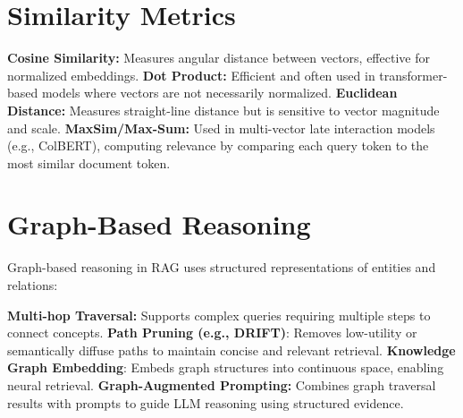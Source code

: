 \documentclass[12pt,twoside]{report}
\begin{document}
\section{Similarity Metrics}
\label{appendix:similarityMetrics}
\textbf{Cosine Similarity:} Measures angular distance between vectors, effective for normalized embeddings.
\textbf{Dot Product:} Efficient and often used in transformer-based models where vectors are not necessarily normalized.
\textbf{Euclidean Distance:} Measures straight-line distance but is sensitive to vector magnitude and scale.
\textbf{MaxSim/Max-Sum:} Used in multi-vector late interaction models (e.g., ColBERT), computing relevance by comparing each query token to the most similar document token.

\section{Graph-Based Reasoning}
\label{appendix:graphBasedReasoning}
Graph-based reasoning in RAG uses structured representations of entities and relations:

\textbf{Multi-hop Traversal:} Supports complex queries requiring multiple steps to connect concepts.
\textbf{Path Pruning (e.g., DRIFT)}: Removes low-utility or semantically diffuse paths to maintain concise and relevant retrieval.
\textbf{Knowledge Graph Embedding}: Embeds graph structures into continuous space, enabling neural retrieval.
\textbf{Graph-Augmented Prompting:} Combines graph traversal results with prompts to guide LLM reasoning using structured evidence.
\end{document}
